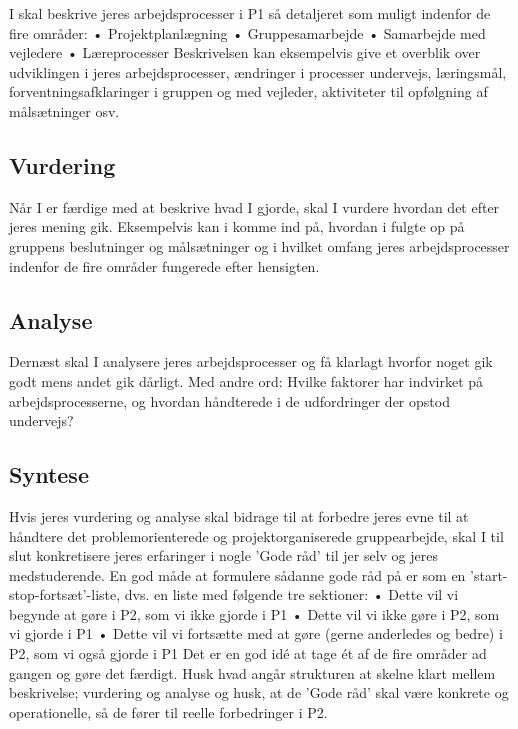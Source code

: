 I skal beskrive jeres arbejdsprocesser i P1 s\aa{} detaljeret som muligt indenfor de fire omr\aa{}der:
    •   Projektplanl\ae{}gning
    •   Gruppesamarbejde
    •   Samarbejde med vejledere
    •   L\ae{}reprocesser
Beskrivelsen kan eksempelvis give et overblik over udviklingen i jeres arbejdsprocesser, \ae{}ndringer
i processer undervejs, l\ae{}ringsm\aa{}l, forventningsafklaringer i gruppen og med vejleder, aktiviteter til
opf\o{}lgning af m\aa{}ls\ae{}tninger osv.


\subsection{Vurdering}

N\aa{}r I er f\ae{}rdige med at beskrive hvad I gjorde, skal I vurdere hvordan det efter jeres mening gik.
Eksempelvis kan i komme ind p\aa{}, hvordan i fulgte op p\aa{} gruppens beslutninger og m\aa{}ls\ae{}tninger og
i hvilket omfang jeres arbejdsprocesser indenfor de fire omr\aa{}der fungerede efter hensigten.


\subsection{Analyse}

Dern\ae{}st skal I analysere jeres arbejdsprocesser og f\aa{} klarlagt hvorfor noget gik godt mens andet gik
d\aa{}rligt. Med andre ord: Hvilke faktorer har indvirket p\aa{} arbejdsprocesserne, og hvordan h\aa{}ndterede
i de udfordringer der opstod undervejs?


\subsection{Syntese}

Hvis jeres vurdering og analyse skal bidrage til at forbedre jeres evne til at h\aa{}ndtere det
problemorienterede og projektorganiserede gruppearbejde, skal I til slut konkretisere jeres
erfaringer i nogle ’Gode r\aa{}d’ til jer selv og jeres medstuderende. En god m\aa{}de at formulere s\aa{}danne
gode r\aa{}d p\aa{} er som en ’start-stop-forts\ae{}t’-liste, dvs. en liste med f\o{}lgende tre sektioner:
    •   Dette vil vi begynde at g\o{}re i P2, som vi ikke gjorde i P1
    •   Dette vil vi ikke g\o{}re i P2, som vi gjorde i P1
    •   Dette vil vi forts\ae{}tte med at g\o{}re (gerne anderledes og bedre) i P2, som vi ogs\aa{} gjorde i P1
Det er en god idé at tage ét af de fire omr\aa{}der ad gangen og g\o{}re det f\ae{}rdigt. Husk hvad ang\aa{}r
strukturen at skelne klart mellem beskrivelse; vurdering og analyse og husk, at de ’Gode r\aa{}d’ skal
v\ae{}re konkrete og operationelle, s\aa{} de f\o{}rer til reelle forbedringer i P2.
